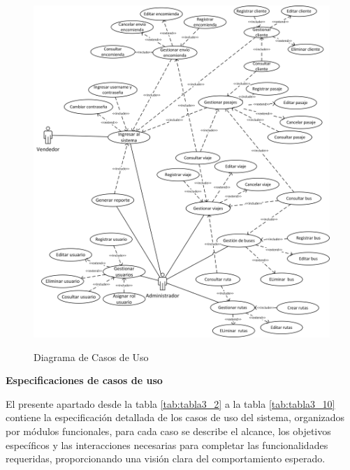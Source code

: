 	\begin{figure}[!h] %
		\caption[Diagrama de Casos de Uso]
		{\newline Diagrama de Casos de Uso} %
		\vspace{0.3cm}
		\centering
		\includegraphics[width=1\textwidth]{imagenes/cap_3/casos_de_uso.png} %
		\vspace{0.3cm}
		\vspace{-0.8cm}
		\label{fig:caso_uso} %
	\end{figure}
	
	\noindent \textbf{Especificaciones de casos de uso}
	
	El presente apartado desde la tabla \ref{tab:tabla3_2} a la tabla \ref{tab:tabla3_10} contiene la especificación detallada de los casos de uso del sistema, organizados por módulos funcionales, para cada caso se describe el alcance, los objetivos específicos y las interacciones necesarias para completar las funcionalidades requeridas, proporcionando una visión clara del comportamiento esperado.
	
